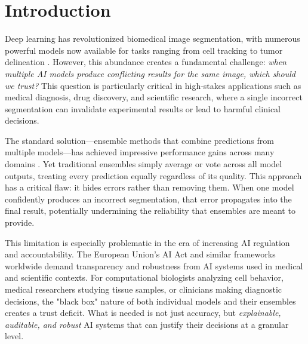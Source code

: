 


\section{Introduction} %

Deep learning has revolutionized biomedical image segmentation, with numerous powerful models now
available for tasks ranging from cell tracking to tumor delineation \cite{minaee2021image}.
However, this abundance creates a fundamental challenge: \emph{when multiple AI models produce
conflicting results for the same image, which should we trust?} This question is particularly
critical in high-stakes applications such as medical diagnosis, drug discovery, and scientific
research, where a single incorrect segmentation can invalidate experimental results or lead to
harmful clinical decisions.

The standard solution—ensemble methods that combine predictions from multiple models—has
achieved impressive performance gains across many domains \cite{nanni2023exploring}. Yet
traditional ensembles simply average or vote across all model outputs, treating every prediction
equally regardless of its quality. This approach has a critical flaw: it hides errors rather than
removing them. When one model confidently produces an incorrect segmentation, that error propagates
into the final result, potentially undermining the reliability that ensembles are meant to provide.

This limitation is especially problematic in the era of increasing AI regulation and
accountability. The European Union's AI Act and similar frameworks worldwide demand transparency
and robustness from AI systems used in medical and scientific contexts. For computational
biologists analyzing cell behavior, medical researchers studying tissue samples, or clinicians
making diagnostic decisions, the "black box" nature of both individual models and their ensembles
creates a trust deficit. What is needed is not just accuracy, but \emph{explainable, auditable, and
robust} AI systems that can justify their decisions at a granular level.

